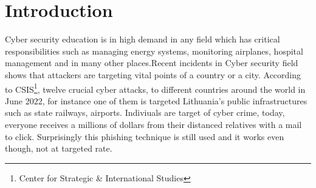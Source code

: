 
\chapter{Introduction}\label{chapter:introduction}

Cyber security education is in high demand in any field which has critical responsibilities such as managing energy systems, monitoring airplanes, hospital management and in many other places.Recent incidents in Cyber security field shows that attackers are targeting vital points of a country or a city. According to CSIS\footnote{Center for Strategic & International Studies}, twelve crucial cyber attacks, to different countries around the world in June 2022, for instance one of them is targeted Lithuania's public infrastructures such as state railways, airports.\cite{cyberincidents} Indiviuals are target of cyber crime, today, everyone receives a millions of dollars from their distanced relatives with a mail to click. Surprisingly this phishing technique is still used and it works even though, not at targeted rate. 


